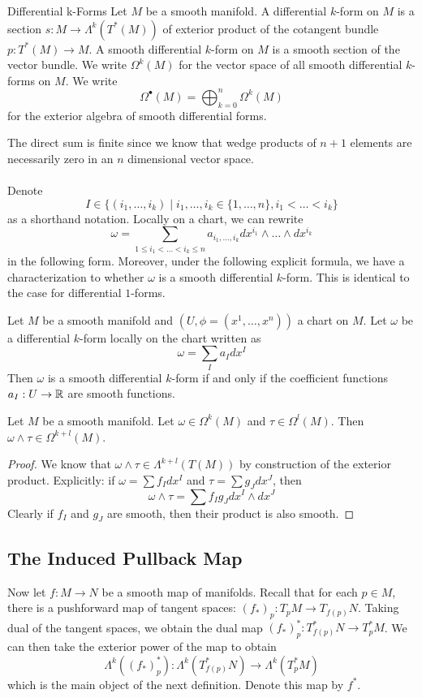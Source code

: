 \documentclass[a4paper]{article}
\begin{document}
\begin{defn}{Differential k-Forms}{} Let $M$ be a smooth manifold. A differential $k$-form on $M$ is a section $s:M\to\Lambda^k(T^\ast(M))$ of exterior product of the cotangent bundle $p:T^\ast(M)\to M$. A smooth differential $k$-form on $M$ is a smooth section of the vector bundle. We write $\Omega^k(M)$ for the vector space of all smooth differential $k$-forms on $M$. We write $$\Omega^\bullet(M)=\bigoplus_{k=0}^n\Omega^k(M)$$ for the exterior algebra of smooth differential forms. 
\end{defn}

The direct sum is finite since we know that wedge products of $n+1$ elements are necessarily zero in an $n$ dimensional vector space. \\~\\

Denote $$I\in\{(i_1,\dots,i_k)\;|\;i_1,\dots,i_k\in\{1,\dots,n\}, i_1<\dots<i_k\}$$ as a shorthand notation. Locally on a chart, we can rewrite $$\omega=\sum_{1\leq i_1<\dots<i_k\leq n}a_{i_1,\dots,i_k}dx^{i_1}\wedge\dots\wedge dx^{i_k}$$ in the following form. Moreover, under the following explicit formula, we have a characterization to whether $\omega$ is a smooth differential $k$-form. This is identical to the case for differential $1$-forms. 

\begin{prp}{}{} Let $M$ be a smooth manifold and $(U,\phi=(x^1,\dots,x^n))$ a chart on $M$. Let $\omega$ be a differential $k$-form locally on the chart written as $$\omega=\sum_{I}a_Idx^I$$ Then $\omega$ is a smooth differential $k$-form if and only if the coefficient functions $a_I:U\to\mathbb{R}$ are smooth functions. 
\end{prp}

\begin{prp}{}{} Let $M$ be a smooth manifold. Let $\omega\in\Omega^k(M)$ and $\tau\in\Omega^l(M)$. Then $\omega\wedge\tau\in\Omega^{k+l}(M)$. \tcbline
\begin{proof}
We know that $\omega\wedge\tau\in\Lambda^{k+l}(T(M))$ by construction of the exterior product. Explicitly: if $\omega=\sum f_Idx^I$ and $\tau=\sum g_Jdx^J$, then $$\omega\wedge\tau=\sum f_Ig_Jdx^I\wedge dx^J$$ Clearly if $f_I$ and $g_J$ are smooth, then their product is also smooth. 
\end{proof}
\end{prp}

\subsection{The Induced Pullback Map}
Now let $f:M\to N$ be a smooth map of manifolds. Recall that for each $p\in M$, there is a pushforward map of tangent spaces: $(f_\ast)_p:T_pM\to T_{f(p)}N$. Taking dual of the tangent spaces, we obtain the dual map $(f_\ast)_p^\ast:T_{f(p)}^\ast N\to T_p^\ast M$. We can then take the exterior power of the map to obtain $$\Lambda^k((f_\ast)_p^\ast):\Lambda^k(T_{f(p)}^\ast N)\to\Lambda^k(T_p^\ast M)$$ which is the main object of the next definition. Denote this map by $f^\ast$. 
\end{document}
